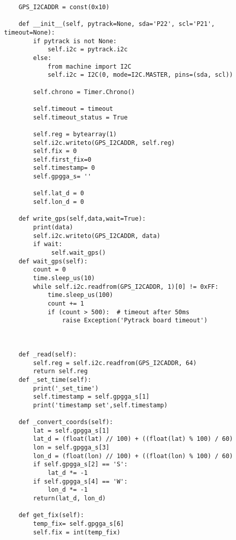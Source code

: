 \begin{appendices}
\begin{lstlisting}
    GPS_I2CADDR = const(0x10)

    def __init__(self, pytrack=None, sda='P22', scl='P21', timeout=None):
        if pytrack is not None:
            self.i2c = pytrack.i2c
        else:
            from machine import I2C
            self.i2c = I2C(0, mode=I2C.MASTER, pins=(sda, scl))

        self.chrono = Timer.Chrono()

        self.timeout = timeout
        self.timeout_status = True

        self.reg = bytearray(1)
        self.i2c.writeto(GPS_I2CADDR, self.reg)
        self.fix = 0
        self.first_fix=0
        self.timestamp= 0
        self.gpgga_s= ''

        self.lat_d = 0
        self.lon_d = 0

    def write_gps(self,data,wait=True):
        print(data)
        self.i2c.writeto(GPS_I2CADDR, data)
        if wait:
             self.wait_gps()    
    def wait_gps(self):
        count = 0
        time.sleep_us(10)
        while self.i2c.readfrom(GPS_I2CADDR, 1)[0] != 0xFF:
            time.sleep_us(100)
            count += 1
            if (count > 500):  # timeout after 50ms
                raise Exception('Pytrack board timeout')


           
    def _read(self):
        self.reg = self.i2c.readfrom(GPS_I2CADDR, 64)
        return self.reg
    def _set_time(self):
        print('_set_time')
        self.timestamp = self.gpgga_s[1]
        print('timestamp set',self.timestamp)

    def _convert_coords(self):
        lat = self.gpgga_s[1]
        lat_d = (float(lat) // 100) + ((float(lat) % 100) / 60)
        lon = self.gpgga_s[3]
        lon_d = (float(lon) // 100) + ((float(lon) % 100) / 60)
        if self.gpgga_s[2] == 'S':
            lat_d *= -1
        if self.gpgga_s[4] == 'W':
            lon_d *= -1
        return(lat_d, lon_d)

    def get_fix(self):
        temp_fix= self.gpgga_s[6]
        self.fix = int(temp_fix)


\end{lstlisting}
\end{appendices}
